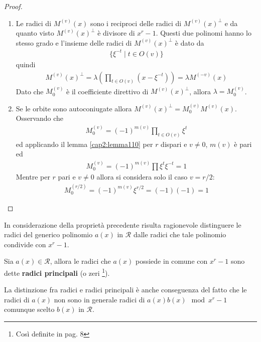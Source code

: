 \begin{proof}
\begin{enumerate}
      \item Le radici di $M^{(v)}(x)$ sono i reciproci delle radici di $M^{(v)}(x)^{\perp}$ e da quanto visto $M^{(v)}(x)^{\perp}$ è divisore di $x^r - 1$. Questi due polinomi hanno lo stesso grado e l'insieme delle radici di $M^{(v)}(x)^{\perp}$ è dato da 
      \begin{align*}
	 \lbrace \xi^{-t} \mid t \in O(v) \rbrace 
       \end{align*}     
      quindi 
      \begin{align*}
	 M^{(v)}(x)^{\perp} = \lambda (\prod_{t \in O(v)}(x-\xi^{-t}) ) = \lambda M^{(-v)}(x)
       \end{align*}  
      Dato che $M_{0}^{(v)}$ è il coefficiente direttivo di $M^{(v)}(x)^{\perp}$, allora $\lambda = M_{0}^{(v)}$. 
      \item Se le orbite sono autoconiugate allora $M^{(v)}(x)^{\perp} = M_{0}^{(v)} M^{(v)}(x)$. Osservando che
      \begin{align*}
	 M_{0}^{(v)}  = (-1)^{m(v)} \prod_{t \in O(v)}\xi^{t} 
       \end{align*}  
       ed applicando il lemma \ref{cap2:lemma110} per $r$ dispari e $v\neq 0$, $m(v)$ è pari ed
       \begin{align*}
	 M_{0}^{(v)}  = (-1)^{m(v)} \prod \xi^{t} \xi^{-t} = 1
       \end{align*} 
       Mentre per $r$ pari e $v\neq 0$ allora si considera solo il caso $v=r/2$:
       \begin{align*}
	 M_{0}^{(r/2)}  = (-1)^{m(v)}  \xi^{r/2}  = (-1)(-1) = 1
       \end{align*} 
   \end{enumerate}
\end{proof}
\noindent
In considerazione della proprietà precedente risulta ragionevole distinguere le radici del generico polinomio $a(x)$ in $\mathcal{R}$ dalle radici che tale polinomio condivide con $x^r - 1$. 
\begin{definizione}
   Sia $a(x) \in \mathcal{R}$, allora le radici che $a(x)$ possiede in comune con $x^r - 1$ sono dette {\bf radici principali} (o zeri \footnote{Così definite in \cite{cerruti} pag. 8}).
\end{definizione}
\noindent
La distinzione fra radici e radici principali è anche conseguenza del fatto che le radici di $a(x)$ non sono in generale radici di $a(x)b(x) \mod{x^r-1}$ comunque scelto $b(x)$ in $\mathcal{R}$. 

